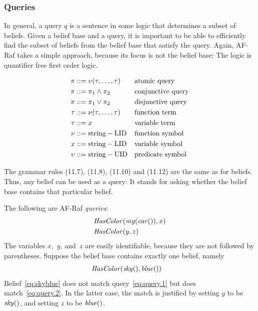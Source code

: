 \documentclass[a4paper,12pt,oneside,fleqn]{book} %
\begin{document}
\subsubsection{Queries}

In general, a query $q$ is a sentence in some logic that determines a
subset of beliefs.  Given a belief base and a query, it is important to be
able to efficiently find the subset of beliefs from the belief base that
satisfy the query.  Again, AF-Raf takes a simple approach, because its
focus is not the belief base: The logic is quantifier free first order
logic.


\begin{align}
\pi &::= \upsilon(\tau,\ldots,\tau) && \text{atomic query}
\\
\pi &::= \pi_1 \land \pi_2 && \text{conjunctive query}
\\
\pi &::= \pi_1 \lor \pi_2 && \text{disjunctive query}
\\
\tau &::= \nu(\tau,\ldots,\tau) && \text{function term}
\\
\tau &::= x && \text{variable term}
\\
\nu  &::= {\rm string-LID} &&\text{function symbol}
\\
x &::= {\rm string-LID} && \text{variable symbol}
\\
\upsilon  &::= {\rm string-UID} &&\text{predicate symbol}
\end{align}

The grammar rules (11.7), (11.8), (11.10) and (11.12) are the same as for
beliefs.  Thus, any belief can be used as a query:  It stands for asking
whether the belief base contains that particular belief.

\begin{example} The following are AF-Raf \emph{queries}: \begin{align}
&{\it HasColor}({\it my}({\it car}()), x) \label{eq:query.1} \\ &{\it
HasColor}(y, z) \label{eq:query.2} \end{align} The variables $x$,~$y$,
and~$z$ are easily identifiable, because they are not followed by
parentheses.  Suppose the belief base contains exactly one belief, namely
\begin{align} &{\it HasColor}({\it sky}(), {\it blue}()) \label{eq:skyblue}
\end{align} Belief~\eqref{eq:skyblue} does not match
query~\eqref{eq:query.1} but does match~\eqref{eq:query.2}.  In the latter
case, the match is justified by setting $y$ to be ${\it sky}()$, and
setting $z$ to be ${\it blue}()$.
\end{example}
\end{document}
